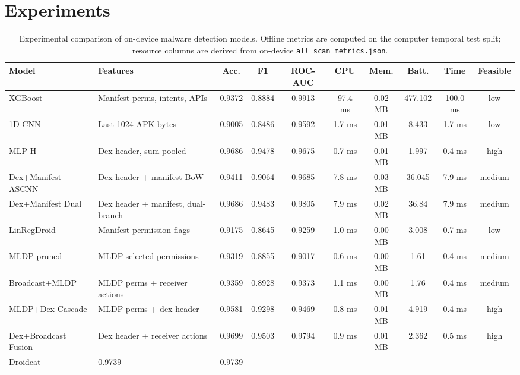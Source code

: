 \documentclass[conference]{IEEEtran}
\begin{document}
	
	
	
	
	
	
	\section{Experiments}
	
	\begin{table}[t]
		\caption{Experimental comparison of on-device malware detection models.
			Offline metrics are computed on the computer temporal test split;
			resource columns are derived from on-device \texttt{all\_scan\_metrics.json}.}
		\label{tab:results}
		\centering
		\scriptsize
		\setlength{\tabcolsep}{8pt}
		\begin{tabular}{@{}l p{3.7cm} c c c c c c c c@{}}
			\toprule
			\textbf{Model} & \textbf{Features} & \textbf{Acc.} & \textbf{F1} & \textbf{ROC-AUC} & \textbf{CPU} & \textbf{Mem.} & \textbf{Batt.} & \textbf{Time} & \textbf{Feasible} \\
			\midrule
			XGBoost & Manifest perms, intents, APIs & 0.9372 & 0.8884 & 0.9913 & 97.4 ms & 0.02 MB & 477.102 & 100.0 ms & low \\
			1D-CNN & Last 1024 APK bytes & 0.9005 & 0.8486 & 0.9592 & 1.7 ms & 0.01 MB & 8.433 & 1.7 ms & low \\
			MLP-H & Dex header, sum-pooled & 0.9686 & 0.9478 & 0.9675 & 0.7 ms & 0.01 
			MB & 1.997 & 0.4 ms & high \\
			Dex+Manifest ASCNN & Dex header + manifest BoW & 0.9411 & 0.9064 & 0.9685 & 7.8 ms & 0.03 MB & 36.045 & 7.9 ms & medium \\
			Dex+Manifest Dual & Dex header + manifest, dual-branch & 0.9686 & 0.9483 & 0.9805 & 7.9 ms & 0.02 MB & 36.84 & 7.9 ms & medium \\
			LinRegDroid & Manifest permission flags & 0.9175 & 0.8645 & 0.9259 & 1.0 ms & 0.00 MB & 3.008 & 0.7 ms & low \\
			MLDP-pruned & MLDP-selected permissions & 0.9319 & 0.8855 & 0.9017 & 0.6 ms & 
			0.00 MB & 1.61 & 0.4 ms & medium \\
			Broadcast+MLDP & MLDP perms + receiver actions & 0.9359 & 0.8928 & 0.9373 & 1.1 ms & 0.00 MB & 1.76 & 0.4 ms & medium \\
			MLDP+Dex Cascade & MLDP perms + dex header & 0.9581 & 0.9298 & 0.9469 & 0.8 ms & 0.01 MB & 4.919 & 0.4 ms & high \\
			Dex+Broadcast Fusion & Dex header + receiver actions & 0.9699 & 0.9503 & 0.9794 & 0.9 ms & 0.01 MB & 2.362 & 0.5 ms & high \\
			Droidcat & 0.9739& 0.9739& \\
			\bottomrule
		\end{tabular}
	\end{table}
	
\end{document}

